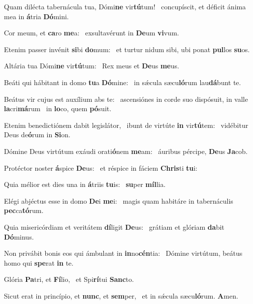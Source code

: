 \item Quam dilécta tabernácula tua, Dómi\textbf{ne} vir\textbf{tú}tum!~\psstar{} concupíscit, et déficit ánima mea in \textbf{á}tria \textbf{Dó}mini.
\item Cor meum, et \textbf{ca}ro \textbf{me}a:~\psstar{} exsultavérunt in \textbf{De}um \textbf{vi}vum.
\item Etenim passer invénit \textbf{si}bi \textbf{do}mum:~\psstar{} et turtur nidum sibi, ubi ponat \textbf{pul}los \textbf{su}os.
\item Altária tua Dómi\textbf{ne} vir\textbf{tú}\-tum:~\psstar{} Rex meus et \textbf{De}us \textbf{me}us.
\item Beáti qui hábitant in domo \textbf{tu}a \textbf{Dó}mine:~\psstar{} in sǽcula sæcu\textbf{ló}rum lau\textbf{dá}bunt te.
\item Beátus vir cujus est auxílium abs te:~\pscross{} ascensiónes in corde suo dispósuit, in valle \textbf{la}cri\textbf{má}rum~\psstar{} in \textbf{lo}co, quem \textbf{pó}suit.
\item Etenim benedictiónem dabit legislátor,~\pscross{} ibunt de virtúte \textbf{in} vir\textbf{tú}tem:~\psstar{} vidébitur Deus de\textbf{ó}rum in \textbf{Si}on.
\item Dómine Deus virtútum exáudi orati\textbf{ó}nem \textbf{me}am:~\psstar{} áuribus pércipe, \textbf{De}us \textbf{Ja}cob.
\item Protéctor noster \textbf{á}spice \textbf{De}us:~\psstar{} et réspice in fáciem \textbf{Chris}ti \textbf{tu}i:
\item Quia mélior est dies una in \textbf{á}triis \textbf{tu}is:~\psstar{} \textbf{su}per \textbf{míl}lia.
\item Elégi abjéctus esse in domo \textbf{De}i \textbf{me}i:~\psstar{} magis quam habitáre in tabernáculis \textbf{pec}ca\textbf{tó}rum.
\item Quia misericórdiam et veritátem \textbf{dí}ligit \textbf{De}us:~\psstar{} grátiam et glóriam \textbf{da}bit \textbf{Dó}minus.
\item Non privábit bonis eos qui ámbulant in \textbf{in}no\textbf{cén}tia:~\psstar{} Dómine virtútum, beátus homo qui \textbf{spe}rat \textbf{in} te.
\item Glória \textbf{Pa}tri, et \textbf{Fí}lio,~\psstar{} et Spi\textbf{rí}tui \textbf{Sanc}to.
\item Sicut erat in princípio, et \textbf{nunc}, et \textbf{sem}per,~\psstar{} et in sǽcula sæcu\textbf{ló}rum. \textbf{A}men.
